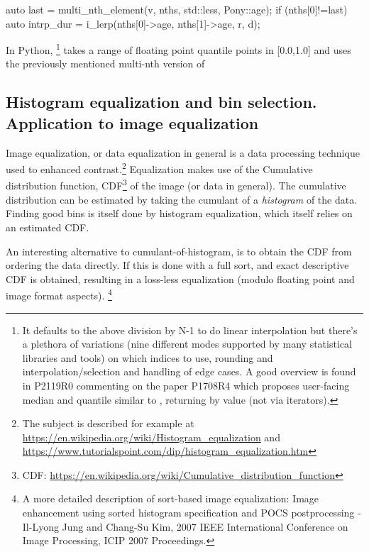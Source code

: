  
\begin{codeblock}
auto last = multi_nth_element(v, nths, std::less{}, Pony::age);
if (nths[0]!=last){
  auto intrp_dur = i_lerp(nths[0]->age, nths[1]->age, r, d);
}
\end{codeblock}
\label{quantileanything}

In Python, %
\footnote{
It defaults to the above division by N-1 to do linear interpolation but there's a plethora of variations (nine different modes supported by many statistical libraries and tools) on which indices to use, rounding and interpolation/\mbox{selection} and handling of edge cases. 
A good overview is found in P2119R0 commenting on the paper P1708R4  which proposes user-facing median and quantile similar to , returning by value (not via iterators).}
 takes a range of floating point quantile points in [0.0,1.0] and uses the previously mentioned multi-nth version of %

\newpage

\subsection{Histogram equalization and bin selection. Application to image equalization} 

Image equalization, or data equalization in general is a data processing technique used to enhanced contrast.\footnote{
The subject is described for example at \url{https://en.wikipedia.org/wiki/Histogram_equalization} and \url{https://www.tutorialspoint.com/dip/histogram_equalization.htm}} 
Equalization makes use of the Cumulative distribution function, CDF\footnote{CDF: \url{https://en.wikipedia.org/wiki/Cumulative_distribution_function}} of the image (or data in general). The cumulative distribution can be estimated by taking the cumulant of a \emph{histogram} of the data. Finding good bins is itself done by histogram equalization, which itself relies on an estimated CDF.

An interesting alternative to cumulant-of-histogram, is to obtain the CDF from ordering the data directly. If this is done with a full sort, and exact descriptive CDF is obtained, resulting in a loss-less equalization (modulo floating point and image format aspects).%
\footnote{A more detailed description of sort-based image equalization: Image enhancement using sorted histogram specification and POCS postprocessing -
Il-Lyong Jung and Chang-Su Kim, 2007 IEEE International Conference on Image Processing, ICIP 2007 Proceedings.}

